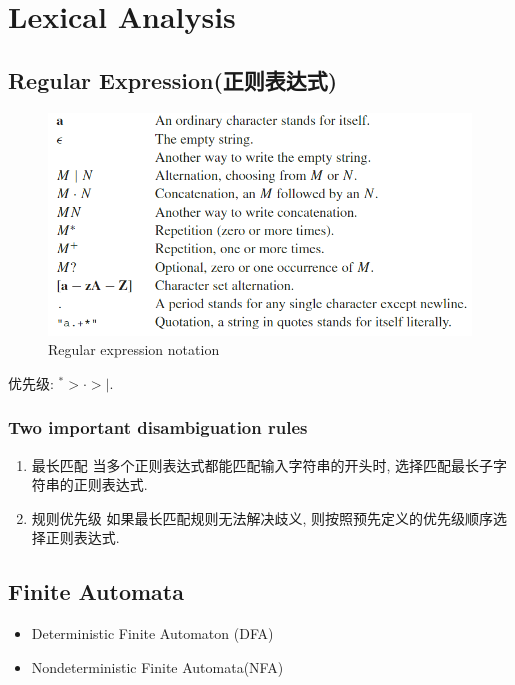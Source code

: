 \section{Lexical Analysis}
\subsection{Regular Expression(正则表达式)}

\begin{figure}[H]
    \centering
    \includegraphics[width=0.88\linewidth]{pic/CP2/Regular expression notation}
    \caption{Regular expression notation}
\end{figure}

优先级: ${}^*> \cdot > |$.

\subsubsection{Two important disambiguation rules}

\begin{enumerate}
    \item 最长匹配
    \subitem 当多个正则表达式都能匹配输入字符串的开头时, 选择匹配最长子字符串的正则表达式. 
    \item 规则优先级
    \subitem 如果最长匹配规则无法解决歧义, 则按照预先定义的优先级顺序选择正则表达式. 
\end{enumerate}

\subsection{Finite Automata}
\begin{itemize}
    \item Deterministic Finite Automaton (DFA) %
    \item Nondeterministic Finite Automata(NFA)
\end{itemize}

